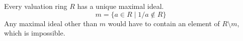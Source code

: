 Every valuation ring $R$ has a unique maximal ideal.
$$m = \{a \in R \mid 1/a \notin R\}$$
Any maximal ideal other than $m$ would have to contain an element of $R \setminus m$, which is impossible.
